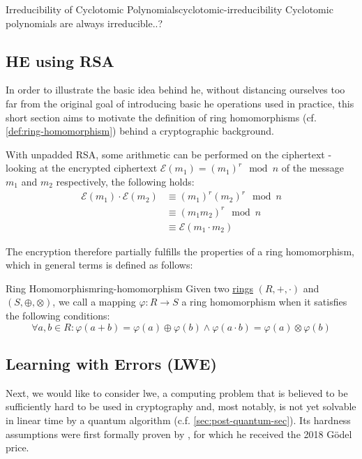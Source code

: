 \begin{remark}{Irreducibility of Cyclotomic Polynomials}{cyclotomic-irreducibility}
  Cyclotomic polynomials are always irreducible..?
\end{remark}

\subsection{HE using RSA}
In order to illustrate the basic idea behind \Gls{he}, without distancing ourselves too far
from the original goal of introducing basic \gls{he} operations used in practice, this short section aims to motivate
the definition of ring homomorphisms (cf. \autoref{def:ring-homomorphism}) behind a cryptographic background.

With unpadded RSA, some arithmetic can be performed on the ciphertext - %
looking at the encrypted ciphertext $\mathcal{E}(m_1) = (m_1)^r \mod n$
of the message $m_1$ and $m_2$ respectively, the following holds:
\begin{align*}
  \mathcal{E}(m_1) \cdot \mathcal{E}(m_2)
   & \equiv (m_1)^r (m_2)^r \mod n     \\
   & \equiv (m_1 m_2)^r \mod n         \\
   & \equiv \mathcal{E}(m_1 \cdot m_2)
\end{align*}

The encryption therefore partially fulfills the properties of a ring homomorphism,
which in general terms is defined as follows:

\begin{definition}{Ring Homomorphism}{ring-homomorphism}
  Given two \hyperref[def:ring]{rings} $(R, +, \cdot)$ and $(S, \oplus, \otimes)$, we call a mapping $\varphi: R \rightarrow S$
  a ring homomorphism when it satisfies the following conditions:
  $$\forall a, b \in R: \varphi(a + b) = \varphi(a) \oplus \varphi(b) \wedge \varphi(a \cdot b) =
    \varphi(a) \otimes \varphi(b)$$
\end{definition}

\subsection{Learning with Errors (LWE)}
Next, we would like to consider \Gls{lwe}, a computing problem that is believed to be sufficiently hard
to be used in cryptography and, most notably, is not yet solvable in linear time by a quantum algorithm
(c.f. \autoref{sec:post-quantum-sec}).
Its hardness assumptions were first formally proven by \citeauthor{2005-lwe-original},
for which he received the 2018 Gödel price.

